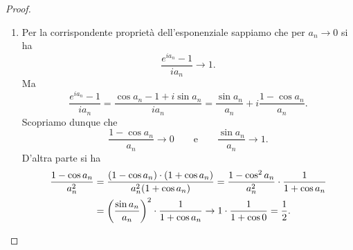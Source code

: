 \begin{proof}
\begin{enumerate}
\item
Per la corrispondente proprietà dell'esponenziale
sappiamo che per $a_n \to 0$ si ha
\[
  \frac{e^{ia_n}-1}{i a_n} \to 1.
\]
Ma
\[
  \frac{e^{ia_n}-1}{i a_n}
  = \frac{\cos a_n - 1 + i \sin a_n}{i a_n}
  = \frac{\sin a_n}{a_n} + i\frac{1- \cos a_n  }{a_n}.
\]
Scopriamo dunque che
\[
  \frac{1-\cos a_n}{a_n} \to 0
  \qquad\text{e}\qquad
  \frac{\sin a_n}{a_n} \to 1.
\]
D'altra parte si ha
\begin{align*}
 \frac{1-\cos a_n}{a_n^2}
 &=\frac{(1-\cos a_n)\cdot(1+\cos a_n)}{a_n^2(1+\cos a_n)}
 = \frac{1-\cos^2 a_n}{a_n^2} \cdot \frac{1}{1+\cos a_n}\\
 &= {\left( \frac{\sin a_n}{a_n} \right)}^2\cdot \frac 1{1+\cos a_n}
 \to 1 \cdot \frac 1 {1+\cos 0} = \frac 1 2.
\end{align*}

\end{enumerate}
\end{proof}

